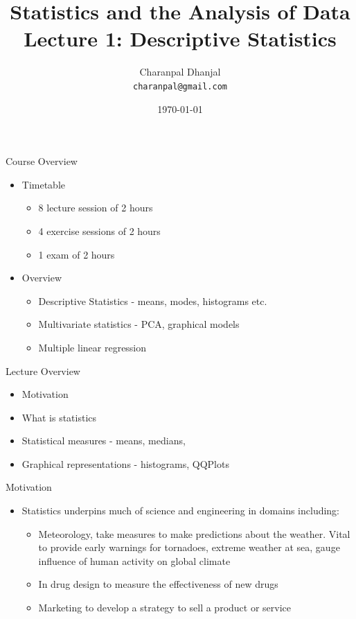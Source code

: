 \documentclass{beamer}
\title{Statistics and the Analysis of Data\\ Lecture 1: Descriptive Statistics}
\author{Charanpal Dhanjal \\ \texttt{charanpal@gmail.com}}
\institute{\'{E}cole des Ponts}
\date{\today}
\begin{document}
\frame{\titlepage}

\begin{frame}{Course Overview}
\begin{itemize}
\item Timetable 
\begin{itemize}
\item 8 lecture session of 2 hours
\item 4 exercise sessions of 2 hours
\item 1 exam of 2 hours 
\end{itemize}
\item Overview
\begin{itemize} 
\item Descriptive Statistics - means, modes, histograms etc. 
\item Multivariate statistics - PCA, graphical models 
\item Multiple linear regression 
\end{itemize}
\end{itemize}
\end{frame}

\begin{frame}{Lecture Overview}
\begin{itemize} 
 \item Motivation 
\item What is statistics 
\item Statistical measures - means, medians, 
\item Graphical representations - histograms, QQPlots 
\end{itemize}
\end{frame}

\begin{frame}{Motivation} 
\begin{itemize} 
 \item Statistics underpins much of science and engineering in domains including: 
\begin{itemize} 
\item Meteorology, take measures to make predictions about the weather. Vital to provide early warnings for tornadoes, extreme weather at sea, gauge influence of human activity on global climate 
\item In drug design to measure the effectiveness of new drugs 
\item Marketing to develop a strategy to sell a product or service 
\end{itemize} 
\end{itemize}
\end{frame}
\end{document}
